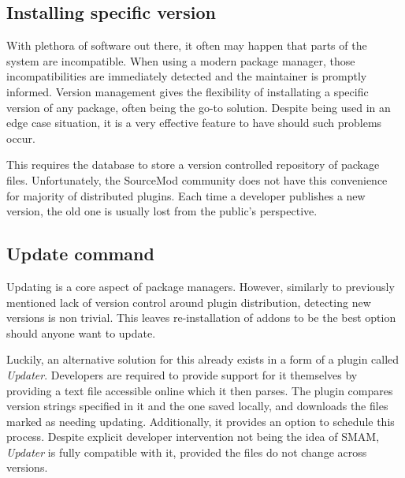 \subsection{Installing specific version}

With plethora of software out there, it often may happen that parts of the system are incompatible.
When using a modern package manager, those incompatibilities are immediately detected and the maintainer is promptly informed.
Version management gives the flexibility of installating a specific version of any package, often being the go-to solution.
Despite being used in an edge case situation, it is a very effective feature to have should such problems occur.

This requires the database to store a version controlled repository of package files.
Unfortunately, the SourceMod community does not have this convenience for majority of distributed plugins.
Each time a developer publishes a new version, the old one is usually lost from the public's perspective.

\subsection{Update command}

Updating is a core aspect of package managers.
However, similarly to previously mentioned lack of version control around plugin distribution, detecting new versions is non trivial.
This leaves re-installation of addons to be the best option should anyone want to update.

Luckily, an alternative solution for this already exists in a form of a plugin called \textit{Updater}.
Developers are required to provide support for it themselves by providing a text file accessible online which it then parses.
The plugin compares version strings specified in it and the one saved locally, and downloads the files marked as needing updating.
Additionally, it provides an option to schedule this process.
Despite explicit developer intervention not being the idea of SMAM, \textit{Updater} is fully compatible with it, provided the files do not change across versions.
